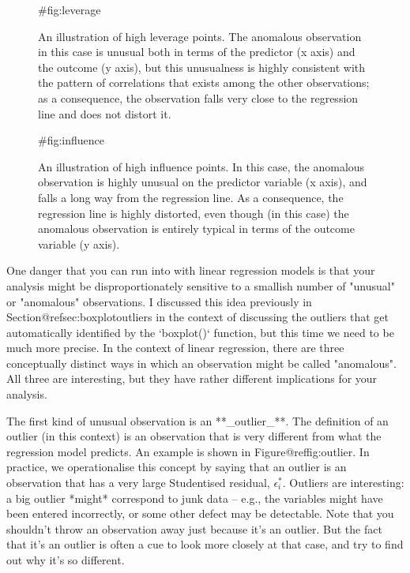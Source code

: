 \begin{figure}[t]
\begin{center}
\caption{An illustration of high leverage points. The anomalous observation in this case is unusual both in terms of the predictor (x axis) and the outcome (y axis), but this unusualness is highly consistent with the pattern of correlations that exists among the other observations; as a consequence, the observation falls very close to the regression line and does not distort it.}
\HR
{#fig:leverage}
\end{center}
\end{figure}

\begin{figure}[t]
\begin{center}
\caption{An illustration of high influence points. In this case, the anomalous observation is highly unusual on the predictor variable (x axis), and falls a long way from the regression line. As a consequence, the regression line is highly distorted, even though (in this case) the anomalous observation is entirely typical in terms of the outcome variable (y axis).}
\HR
{#fig:influence}
\end{center}
\end{figure}



One danger that you can run into with linear regression models is that your analysis might be disproportionately sensitive to a smallish number of "unusual" or "anomalous" observations. I discussed this idea previously in Section@refsec:boxplotoutliers in the context of discussing the outliers that get automatically identified by the `boxplot()` function, but this time we need to be much more precise. In the context of linear regression, there are three conceptually distinct ways in which an observation might be called "anomalous". All three are interesting, but they have rather different implications for your analysis.

The first kind of unusual observation is an **_outlier_**. The definition of an outlier (in this context) is an observation that is very different from what the regression model predicts. An example is shown in Figure@reffig:outlier. In practice, we operationalise this concept by saying that an outlier is an observation that has a very large Studentised residual, $\epsilon_i^*$. Outliers are interesting: a big outlier *might* correspond to junk data -- e.g., the variables might have been entered incorrectly, or some other defect may be detectable. Note that you shouldn't throw an observation away just because it's an outlier. But the fact that it's an outlier is often a cue to look more closely at that case, and try to find out why it's so different.

